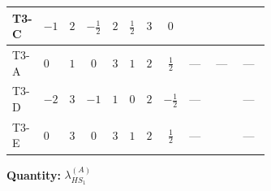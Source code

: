 \documentclass[8pt]{article}
\begin{document}
\begin{landscape}
\begin{longtable}{@{}llcccccc >{\raggedright\arraybackslash}p{0.21\linewidth} >{\raggedright\arraybackslash}p{0.21\linewidth} >{\raggedright\arraybackslash}p{0.21\linewidth}@{}}
T3-C & $-1$ & $2$ & $-\frac{1}{2}$ & $2$ & $\frac{1}{2}$ & $3$ & $0$ & \scriptsize\adjustbox{max width=\linewidth}{$\begin{gathered} -\frac{4}{3} {\lambda_{H H^\dagger S_1^\dagger S_2^\dagger}^{\rm Cross}} (2 \left({\lambda_{H H^\dagger S_1^\dagger S_2^\dagger}^{\rm Cross}}\right)^{*}+\left({\lambda_{11}}\right)^{*})\end{gathered}$} & \scriptsize\adjustbox{max width=\linewidth}{$\begin{gathered} +\frac{16}{3} {\lambda_5} \left({\lambda_5}\right)^{*}\end{gathered}$} & \scriptsize\adjustbox{max width=\linewidth}{$\begin{gathered} +{g_1}^2 \left(-6 {g_2}^2-3 {\lambda_{HS_1}^{(A)}}\right)\end{gathered}$} \\
\midrule
T3-A & $0$ & $1$ & $0$ & $3$ & $1$ & $2$ & $\frac{1}{2}$ & --- & --- & --- \\
\midrule
T3-D & $-2$ & $3$ & $-1$ & $1$ & $0$ & $2$ & $-\frac{1}{2}$ & --- & \scriptsize\adjustbox{max width=\linewidth}{$\begin{gathered} -\frac{8}{3} {\lambda_5} \left({\lambda_5}\right)^{*}\end{gathered}$} & --- \\
\midrule
T3-E & $0$ & $3$ & $0$ & $3$ & $1$ & $2$ & $\frac{1}{2}$ & --- & \scriptsize\adjustbox{max width=\linewidth}{$\begin{gathered} -\frac{4}{3} {\lambda_5} \left({\lambda_5}\right)^{*}\end{gathered}$} & --- \\
\midrule
\bottomrule
\end{longtable}
\clearpage
\noindent\textbf{Quantity: }$\lambda_{HS_1}^{(A)}$\par\smallskip

\end{landscape}
\end{document}
